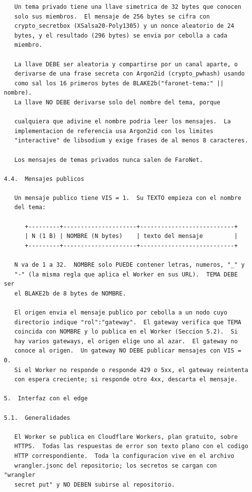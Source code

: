 \newpage
\begin{Verbatim}
   Un tema privado tiene una llave simetrica de 32 bytes que conocen
   solo sus miembros.  El mensaje de 256 bytes se cifra con
   crypto_secretbox (XSalsa20-Poly1305) y un nonce aleatorio de 24
   bytes, y el resultado (296 bytes) se envia por cebolla a cada
   miembro.

   La llave DEBE ser aleatoria y compartirse por un canal aparte, o
   derivarse de una frase secreta con Argon2id (crypto_pwhash) usando
   como sal los 16 primeros bytes de BLAKE2b("faronet-tema:" || nombre).
   La llave NO DEBE derivarse solo del nombre del tema, porque

   cualquiera que adivine el nombre podria leer los mensajes.  La
   implementacion de referencia usa Argon2id con los limites
   "interactive" de libsodium y exige frases de al menos 8 caracteres.

   Los mensajes de temas privados nunca salen de FaroNet.

4.4.  Mensajes publicos

   Un mensaje publico tiene VIS = 1.  Su TEXTO empieza con el nombre
   del tema:

      +---------+---------------------+---------------------------+
      | N (1 B) | NOMBRE (N bytes)    | texto del mensaje         |
      +---------+---------------------+---------------------------+

   N va de 1 a 32.  NOMBRE solo PUEDE contener letras, numeros, "_" y
   "-" (la misma regla que aplica el Worker en sus URL).  TEMA DEBE ser
   el BLAKE2b de 8 bytes de NOMBRE.

   El origen envia el mensaje publico por cebolla a un nodo cuyo
   directorio indique "rol":"gateway".  El gateway verifica que TEMA
   coincida con NOMBRE y lo publica en el Worker (Seccion 5.2).  Si
   hay varios gateways, el origen elige uno al azar.  El gateway no
   conoce al origen.  Un gateway NO DEBE publicar mensajes con VIS = 0.
   Si el Worker no responde o responde 429 o 5xx, el gateway reintenta
   con espera creciente; si responde otro 4xx, descarta el mensaje.

5.  Interfaz con el edge

5.1.  Generalidades

   El Worker se publica en Cloudflare Workers, plan gratuito, sobre
   HTTPS.  Todas las respuestas de error son texto plano con el codigo
   HTTP correspondiente.  Toda la configuracion vive en el archivo
   wrangler.jsonc del repositorio; los secretos se cargan con "wrangler
   secret put" y NO DEBEN subirse al repositorio.
\end{Verbatim}

